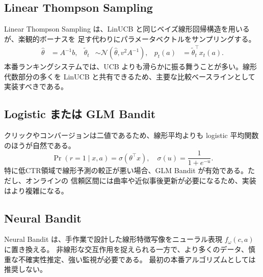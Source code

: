 \documentclass[uplatex,dvipdfmx,11pt,a4paper]{bxjsarticle}
\begin{document}
\subsection{Linear Thompson Sampling}
Linear Thompson Sampling は、LinUCB と同じベイズ線形回帰構造を用いるが、楽観的ボーナスを
足す代わりにパラメータベクトルをサンプリングする。
\begin{align}
  \hat\theta &= A^{-1}b, &
  \tilde\theta_t &\sim \mathcal{N}(\hat\theta, v^2 A^{-1}), &
  p_t(a)&=\tilde\theta_t^\top x_t(a).
\end{align}
本番ランキングシステムでは、UCB よりも滑らかに振る舞うことが多い。線形代数部分の多くを
LinUCB と共有できるため、主要な比較ベースラインとして実装すべきである。

\subsection{Logistic または GLM Bandit}
クリックやコンバージョンは二値であるため、線形平均よりも logistic 平均関数のほうが自然である。
\begin{equation}
  \Pr(r=1\mid x,a)=\sigma(\theta^\top x), \quad
  \sigma(u)=\frac{1}{1+e^{-u}}.
\end{equation}
特に低CTR領域で線形予測の較正が悪い場合、GLM Bandit が有効である。ただし、オンラインの
信頼区間には曲率や近似事後更新が必要になるため、実装はより複雑になる。

\subsection{Neural Bandit}
Neural Bandit は、手作業で設計した線形特徴写像をニューラル表現 $f_\omega(c,a)$ に置き換える。
非線形な交互作用を捉えられる一方で、より多くのデータ、慎重な不確実性推定、強い監視が必要である。
最初の本番アルゴリズムとしては推奨しない。
\end{document}
